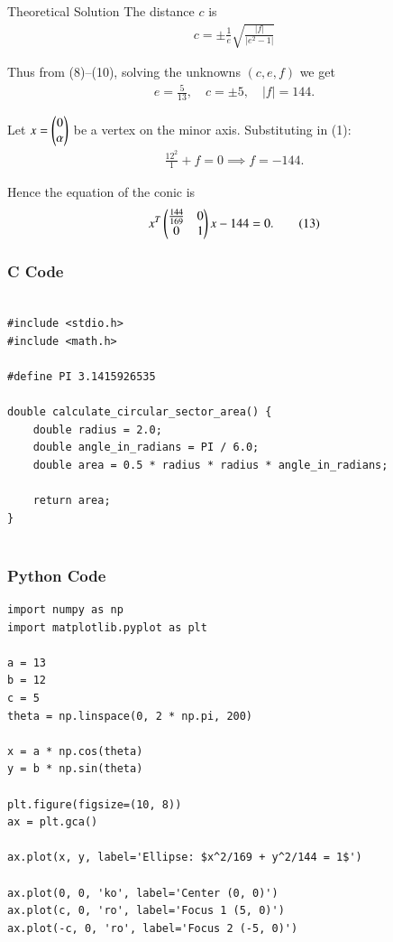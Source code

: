 \documentclass{beamer}
\begin{document}
\begin{frame}{Theoretical Solution}
The distance $c$ is
\begin{align}
c = \pm \frac{1}{e}\sqrt{\frac{|f|}{|e^2-1|}} \tag{10}
\end{align}

Thus from (8)--(10), solving the unknowns $(c,e,f)$ we get
\begin{align}
e = \tfrac{5}{13},\quad c = \pm 5, \quad |f| = 144. \tag{11}
\end{align}

Let $x=\begin{pmatrix}0\\\alpha\end{pmatrix}$ be a vertex on the minor axis. Substituting in (1):
\begin{align}
\frac{12^2}{1} + f = 0 \implies f=-144. \tag{12}
\end{align}

Hence the equation of the conic is
\begin{align*}
x^T \begin{pmatrix}\tfrac{144}{169} & 0 \\ 0 & 1\end{pmatrix} x - 144 = 0. \tag{13}
\end{align*}
\end{frame}

\begin{frame}[fragile]
    \frametitle{C Code}

    \begin{lstlisting}

#include <stdio.h>
#include <math.h>

#define PI 3.1415926535

double calculate_circular_sector_area() {
    double radius = 2.0;
    double angle_in_radians = PI / 6.0;
    double area = 0.5 * radius * radius * angle_in_radians;
    
    return area;
}


    \end{lstlisting}
\end{frame}


\begin{frame}[fragile]
    \frametitle{Python Code}
    \begin{lstlisting}
import numpy as np
import matplotlib.pyplot as plt

a = 13
b = 12
c = 5
theta = np.linspace(0, 2 * np.pi, 200)

x = a * np.cos(theta)
y = b * np.sin(theta)

plt.figure(figsize=(10, 8))
ax = plt.gca()

ax.plot(x, y, label='Ellipse: $x^2/169 + y^2/144 = 1$')

ax.plot(0, 0, 'ko', label='Center (0, 0)')
ax.plot(c, 0, 'ro', label='Focus 1 (5, 0)')
ax.plot(-c, 0, 'ro', label='Focus 2 (-5, 0)')


    \end{lstlisting}
\end{frame}
\end{document}
